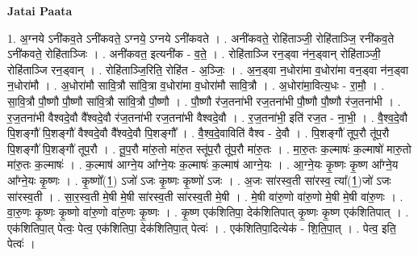 \documentclass[17pt]{extarticle}
\begin{document}
\textbf{Jatai Paata} \newline

1. अ॒ग्नये ऽनी॑कव॒ते ऽनी॑कवते॒ ऽग्नये॒ ऽग्नये ऽनी॑कवते । . अनी॑कवते॒ रोहि॑ताञ्जी॒ रोहि॑ताञ्जि॒ रनी॑कव॒ते ऽनी॑कवते॒ रोहि॑ताञ्जिः । . अनी॑कवत॒ इत्यनी॑क - व॒ते॒ । . रोहि॑ताञ्जि रन॒ड्वा न॑न॒ड्वान् रोहि॑ताञ्जी॒ रोहि॑ताञ्जि रन॒ड्वान् । . रोहि॑ताञ्जि॒रिति॒ रोहि॑त - अ॒ञ्जिः॒ । . अ॒न॒ड्वा न॒धोरा॑मा व॒धोरा॑मा वन॒ड्वा न॑न॒ड्वा न॒धोरा॑मौ । . अ॒धोरा॑मौ सावि॒त्रौ सा॑वि॒त्रा व॒धोरा॑मा व॒धोरा॑मौ सावि॒त्रौ । . अ॒धोरा॑मा॒वित्य॒धः - रा॒मौ॒ । . सा॒वि॒त्रौ पौ॒ष्णौ पौ॒ष्णौ सा॑वि॒त्रौ सा॑वि॒त्रौ पौ॒ष्णौ । . पौ॒ष्णौ र॑ज॒तना॑भी रज॒तना॑भी पौ॒ष्णौ पौ॒ष्णौ र॑ज॒तना॑भी । . र॒ज॒तना॑भी वैश्वदे॒वौ वै᳚श्वदे॒वौ र॑ज॒तना॑भी रज॒तना॑भी वैश्वदे॒वौ । . र॒ज॒तना॑भी॒ इति॑ रज॒त - ना॒भी॒ । . वै॒श्व॒दे॒वौ पि॒शङ्गौ॑ पि॒शङ्गौ॑ वैश्वदे॒वौ वै᳚श्वदे॒वौ पि॒शङ्गौ᳚ । . वै॒श्व॒दे॒वाविति॑ वैश्व - दे॒वौ । . पि॒शङ्गौ॑ तूप॒रौ तू॑प॒रौ पि॒शङ्गौ॑ पि॒शङ्गौ॑ तूप॒रौ । . तू॒प॒रौ मा॑रु॒तो मा॑रु॒त स्तू॑प॒रौ तू॑प॒रौ मा॑रु॒तः । . मा॒रु॒तः क॒ल्माषः॑ क॒ल्माषो॑ मारु॒तो मा॑रु॒तः क॒ल्माषः॑ । . क॒ल्माष॑ आग्ने॒य आ᳚ग्ने॒यः क॒ल्माषः॑ क॒ल्माष॑ आग्ने॒यः । . आ॒ग्ने॒यः कृ॒ष्णः कृ॒ष्ण आ᳚ग्ने॒य आ᳚ग्ने॒यः कृ॒ष्णः । . कृ॒ष्णो᳚(1॒) ऽजो॑ ऽजः कृ॒ष्णः कृ॒ष्णो॑ ऽजः । . अ॒जः सा॑रस्व॒ती सा॑रस्व॒ त्या᳚(1॒)जो॑ ऽजः सा॑रस्व॒ती । . सा॒र॒स्व॒ती मे॒षी मे॒षी सा॑रस्व॒ती सा॑रस्व॒ती मे॒षी । . मे॒षी वा॑रु॒णो वा॑रु॒णो मे॒षी मे॒षी वा॑रु॒णः । . वा॒रु॒णः कृ॒ष्णः कृ॒ष्णो वा॑रु॒णो वा॑रु॒णः कृ॒ष्णः । . कृ॒ष्ण एक॑शितिपा॒ देक॑शितिपात् कृ॒ष्णः कृ॒ष्ण एक॑शितिपात् । . एक॑शितिपा॒त् पेत्वः॒ पेत्व॒ एक॑शितिपा॒ देक॑शितिपा॒त् पेत्वः॑ । . एक॑शितिपा॒दित्येक॑ - शि॒ति॒पा॒त् । . पेत्व॒ इति॒ पेत्वः॑ । \newline
\end{document}
